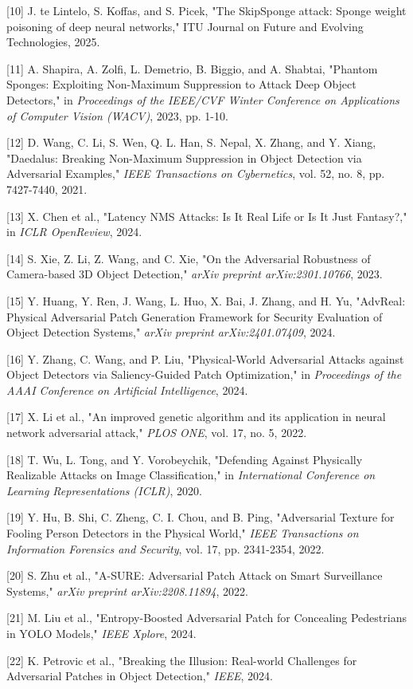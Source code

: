 {[}10{]} J. te Lintelo, S. Koffas, and S. Picek, "The SkipSponge attack:
Sponge weight poisoning of deep neural networks," ITU Journal on Future
and Evolving Technologies, 2025.

{[}11{]} A. Shapira, A. Zolfi, L. Demetrio, B. Biggio, and A. Shabtai,
"Phantom Sponges: Exploiting Non-Maximum Suppression to Attack Deep
Object Detectors," in \emph{Proceedings of the IEEE/CVF Winter
Conference on Applications of Computer Vision (WACV)}, 2023, pp. 1-10.

{[}12{]} D. Wang, C. Li, S. Wen, Q. L. Han, S. Nepal, X. Zhang, and Y.
Xiang, "Daedalus: Breaking Non-Maximum Suppression in Object Detection
via Adversarial Examples," \emph{IEEE Transactions on Cybernetics}, vol.
52, no. 8, pp. 7427-7440, 2021.

{[}13{]} X. Chen et al., "Latency NMS Attacks: Is It Real Life or Is It
Just Fantasy?," in \emph{ICLR OpenReview}, 2024.

{[}14{]} S. Xie, Z. Li, Z. Wang, and C. Xie, "On the Adversarial
Robustness of Camera-based 3D Object Detection," \emph{arXiv preprint
arXiv:2301.10766}, 2023.

{[}15{]} Y. Huang, Y. Ren, J. Wang, L. Huo, X. Bai, J. Zhang, and H. Yu,
"AdvReal: Physical Adversarial Patch Generation Framework for Security
Evaluation of Object Detection Systems," \emph{arXiv preprint
arXiv:2401.07409}, 2024.

{[}16{]} Y. Zhang, C. Wang, and P. Liu, "Physical-World Adversarial
Attacks against Object Detectors via Saliency-Guided Patch
Optimization," in \emph{Proceedings of the AAAI Conference on Artificial
Intelligence}, 2024.

{[}17{]} X. Li et al., "An improved genetic algorithm and its
application in neural network adversarial attack," \emph{PLOS ONE}, vol.
17, no. 5, 2022.

{[}18{]} T. Wu, L. Tong, and Y. Vorobeychik, "Defending Against
Physically Realizable Attacks on Image Classification," in
\emph{International Conference on Learning Representations (ICLR)},
2020.

{[}19{]} Y. Hu, B. Shi, C. Zheng, C. I. Chou, and B. Ping, "Adversarial
Texture for Fooling Person Detectors in the Physical World," \emph{IEEE
Transactions on Information Forensics and Security}, vol. 17, pp.
2341-2354, 2022.

{[}20{]} S. Zhu et al., "A-SURE: Adversarial Patch Attack on Smart
Surveillance Systems," \emph{arXiv preprint arXiv:2208.11894}, 2022.

{[}21{]} M. Liu et al., "Entropy-Boosted Adversarial Patch for
Concealing Pedestrians in YOLO Models," \emph{IEEE Xplore}, 2024.

{[}22{]} K. Petrovic et al., "Breaking the Illusion: Real-world
Challenges for Adversarial Patches in Object Detection," \emph{IEEE},
2024.
